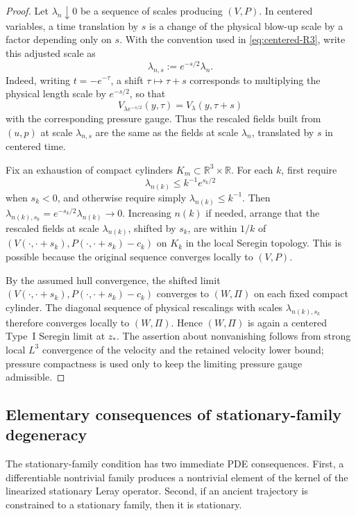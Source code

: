 \documentclass[11pt]{amsart}
\numberwithin{equation}{section}
\theoremstyle{plain}
\theoremstyle{definition}
\theoremstyle{remark}
\begin{document}
\begin{proof}
Let \(\lambda_n\downarrow0\) be a sequence of scales producing \((V,P)\).  In
centered variables, a time translation by \(s\) is a change of the
physical blow-up scale by a factor depending only on \(s\).  With the convention
used in \eqref{eq:centered-R3}, write this adjusted scale as
\begin{equation}\label{eq:R3-adjusted-scale}
   \lambda_{n,s}:=e^{-s/2}\lambda_n .
\end{equation}
Indeed, writing \(t=-e^{-\tau}\), a shift
\(\tau\mapsto\tau+s\) corresponds to multiplying the physical length scale by
\(e^{-s/2}\), so that
\[
   V_{\lambda e^{-s/2}}(y,\tau)=V_\lambda(y,\tau+s)
\]
with the corresponding pressure gauge.  Thus the rescaled fields built from
\((u,p)\) at scale \(\lambda_{n,s}\) are the same as the fields at scale
\(\lambda_n\), translated by \(s\) in centered time.

Fix an exhaustion of compact cylinders \(K_m\subset\mathbb R^3\times\mathbb R\).
For each \(k\), first require
\[
   \lambda_{n(k)}
   \le k^{-1}e^{s_k/2}
\]
when \(s_k<0\), and otherwise require simply \(\lambda_{n(k)}\le k^{-1}\).
Then \(\lambda_{n(k),s_k}=e^{-s_k/2}\lambda_{n(k)}\to0\).  Increasing
\(n(k)\) if needed, arrange that the rescaled fields at scale
\(\lambda_{n(k)}\), shifted by \(s_k\), are within \(1/k\) of
\((V(\cdot,\cdot+s_k),P(\cdot,\cdot+s_k)-c_k)\) on \(K_k\) in the local
Seregin topology.  This is possible because the original sequence converges
locally to \((V,P)\).

By the assumed hull convergence, the shifted limit
\((V(\cdot,\cdot+s_k),P(\cdot,\cdot+s_k)-c_k)\) converges to \((W,\Pi)\) on each
fixed compact cylinder.  The diagonal sequence of physical rescalings with
scales \(\lambda_{n(k),s_k}\) therefore converges locally to \((W,\Pi)\).  Hence
\((W,\Pi)\) is again a centered Type~I Seregin limit at \(z_*\).  The assertion
about nonvanishing follows from strong local \(L^3\) convergence of the
velocity and the retained velocity lower bound; pressure compactness is used
only to keep the limiting pressure gauge admissible.
\end{proof}

\subsection{Elementary consequences of stationary-family degeneracy}

The stationary-family condition has two immediate PDE consequences.  First, a differentiable
nontrivial family produces a nontrivial element of the kernel of the linearized
stationary Leray operator.  Second, if an ancient trajectory is
constrained to a stationary family, then it is stationary.
\end{document}
